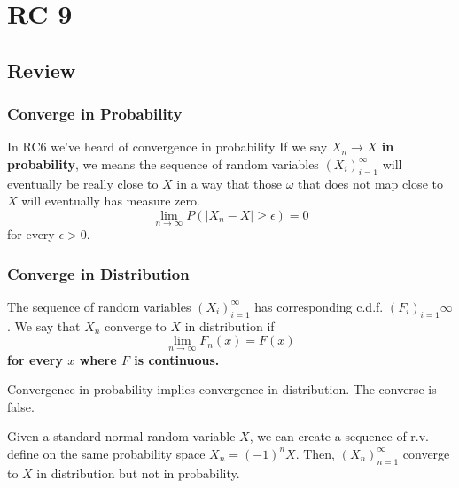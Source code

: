 \chapter{RC 9}

\section{Review}
\subsection*{Converge in Probability}
In RC6 we've heard of convergence in probability 
If we say \textbf{ \(X_n \to X\) in probability}, we means the sequence of random variables \((X_i)_{i=1}^\infty\) will eventually be really close to \(X\) in a way that
those \(\omega \) that does not map close to \(X\) will eventually has measure zero. 
\[
    \lim\limits_{n \to \infty} P(|X_n -X| \geq \epsilon  ) = 0
\]    
for every \(\epsilon >0\). 
\subsection*{Converge in Distribution}
The sequence of random variables \((X_i)_{i=1}^\infty\) has corresponding c.d.f. \((F_i)_{i=1}\infty  \).  We say that \(X_n\) converge to \(X\) in distribution if     
\[
    \lim\limits_{n \to \infty} F_n(x)  = F(x)
\]    
\textbf{for every \(x\) where \(F\)  is continuous.}  

\begin{remark}
 Convergence in probability implies convergence in distribution. The converse is false. 
\end{remark}
\begin{eg}
    Given a standard normal random variable \(X\), we can create a sequence of r.v. define on the same probability space \(X_n = (-1)^n X\). Then, \((X_n)_{n=1}^{\infty} \) converge to \(X\) in distribution but not in probability.  
\end{eg}
